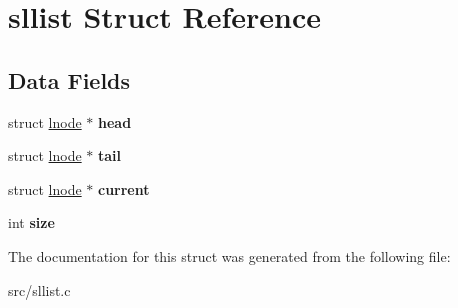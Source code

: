 \hypertarget{structsllist}{\section{sllist Struct Reference}
\label{structsllist}
}
\subsection*{Data Fields}
\begin{DoxyCompactItemize}
\item 
\hypertarget{structsllist_ad4a6cc2a76ae7862bde46949d8087c10}{struct \hyperlink{structlnode}{lnode} $\ast$ {\bfseries head}}\label{structsllist_ad4a6cc2a76ae7862bde46949d8087c10}

\item 
\hypertarget{structsllist_ae2f40cda9d1f7f6f7a4542d2afdba974}{struct \hyperlink{structlnode}{lnode} $\ast$ {\bfseries tail}}\label{structsllist_ae2f40cda9d1f7f6f7a4542d2afdba974}

\item 
\hypertarget{structsllist_af86662ddba5c13fcf09121b1d2a23dac}{struct \hyperlink{structlnode}{lnode} $\ast$ {\bfseries current}}\label{structsllist_af86662ddba5c13fcf09121b1d2a23dac}

\item 
\hypertarget{structsllist_ade4bdc08b2c8cbcb7adf2ac0b222fe87}{int {\bfseries size}}\label{structsllist_ade4bdc08b2c8cbcb7adf2ac0b222fe87}

\end{DoxyCompactItemize}


The documentation for this struct was generated from the following file\-:\begin{DoxyCompactItemize}
\item 
src/sllist.\-c\end{DoxyCompactItemize}

